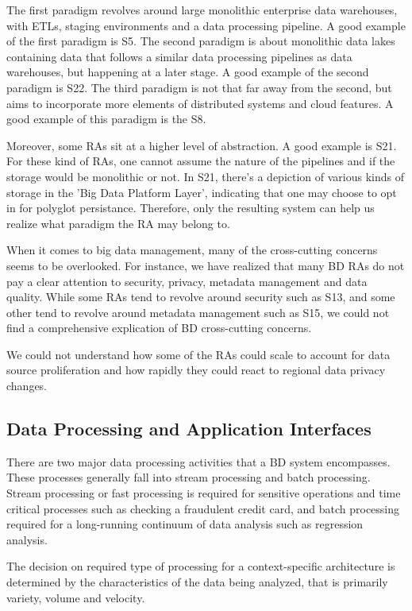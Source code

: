 \documentclass{ieeeaccess}
\begin{document}
The first paradigm revolves around large monolithic enterprise data warehouses, with ETLs, staging environments and a data processing pipeline. A good example of the first paradigm is S5. The second paradigm is about monolithic data lakes containing data that follows a similar data processing pipelines as data warehouses, but happening at a later stage. A good example of the second paradigm is S22. The third paradigm is not that far away from the second, but aims to incorporate more elements of distributed systems and cloud features. A good example of this paradigm is the S8.

Moreover, some RAs sit at a higher level of abstraction. A good example is S21. For these kind of RAs, one cannot assume the nature of the pipelines and if the storage would be monolithic or not. In S21, there's a depiction of various kinds of storage in the 'Big Data Platform Layer', indicating that one may choose to opt in for polyglot persistance. Therefore, only the resulting system can help us realize what paradigm the RA may belong to. 

When it comes to big data management, many of the cross-cutting concerns seems to be overlooked. For instance, we have realized that many BD RAs do not pay a clear attention to security, privacy, metadata management and data quality. While some RAs tend to revolve around security such as S13, and some other tend to revolve around metadata management such as S15, we could not find a comprehensive explication of BD cross-cutting concerns.

We could not understand how some of the RAs could scale to account for data source proliferation and how rapidly they could react to regional data privacy changes. 

\subsection{Data Processing and Application Interfaces}

There are two major data processing activities that a BD system encompasses. These processes generally fall into stream processing and batch processing. Stream processing or fast processing is required for sensitive operations and time critical processes such as checking a fraudulent credit card, and batch processing required for a long-running continuum of data analysis such as regression analysis. 

The decision on required type of processing for a context-specific architecture is determined by the characteristics of the data being analyzed, that is primarily variety, volume and velocity. 
\end{document}
